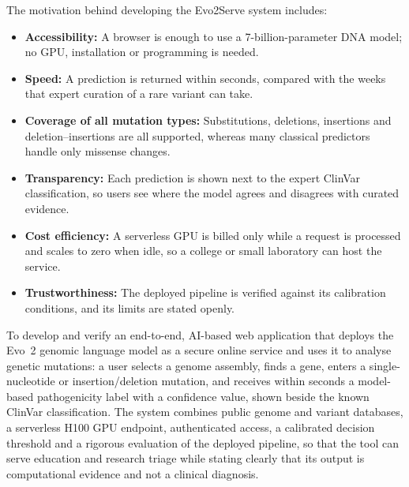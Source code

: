 The motivation behind developing the Evo2Serve system includes:

\begin{itemize}
\item \textbf{Accessibility:} A browser is enough to use a 7-billion-parameter DNA model; no GPU, installation or programming is needed.
\item \textbf{Speed:} A prediction is returned within seconds, compared with the weeks that expert curation of a rare variant can take.
\item \textbf{Coverage of all mutation types:} Substitutions, deletions, insertions and deletion--insertions are all supported, whereas many classical predictors handle only missense changes.
\item \textbf{Transparency:} Each prediction is shown next to the expert ClinVar classification, so users see where the model agrees and disagrees with curated evidence.
\item \textbf{Cost efficiency:} A serverless GPU is billed only while a request is processed and scales to zero when idle, so a college or small laboratory can host the service.
\item \textbf{Trustworthiness:} The deployed pipeline is verified against its calibration conditions, and its limits are stated openly.
\end{itemize}

\vspace{6pt}
To develop and verify an end-to-end, AI-based web application that deploys the Evo~2 genomic language model as a secure online service and uses it to analyse genetic mutations: a user selects a genome assembly, finds a gene, enters a single-nucleotide or insertion/deletion mutation, and receives within seconds a model-based pathogenicity label with a confidence value, shown beside the known ClinVar classification. The system combines public genome and variant databases, a serverless H100 GPU endpoint, authenticated access, a calibrated decision threshold and a rigorous evaluation of the deployed pipeline, so that the tool can serve education and research triage while stating clearly that its output is computational evidence and not a clinical diagnosis.

